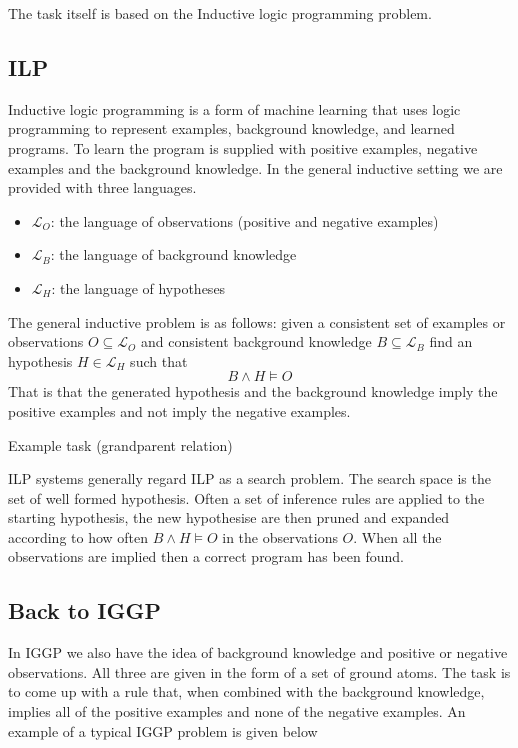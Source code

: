The task itself is based on the Inductive logic programming problem.

\subsection{ILP}\label{sec:ILP}
Inductive logic programming is a form of machine learning that uses logic programming to represent examples, background knowledge, and learned programs\cite{Cropper/EfficientLearning}. To learn the program is supplied with positive examples, negative examples and the background knowledge. In the general inductive setting we are provided with three languages.
\begin{itemize}
\item $\mathcal{L}_O$: the language of observations (positive and negative examples)
\item $\mathcal{L}_B$: the language of background knowledge
\item $\mathcal{L}_H$: the language of hypotheses
\end{itemize}
The general inductive problem is as follows: given a consistent set of examples or observations $O \subseteq \mathcal{L}_O$ and consistent background knowledge $B \subseteq \mathcal{L}_B$ find an hypothesis $H \in \mathcal{L}_H$ such that \[B \wedge H \vDash O\] \cite{Muggleton/ILP}
That is that the generated hypothesis and the background knowledge imply the positive examples and not imply the negative examples.

Example task (grandparent relation)

ILP systems generally regard ILP as a search problem. The search space is the set of well formed hypothesis. Often a set of inference rules are applied to the starting hypothesis, the new hypothesise are then pruned and expanded according to how often $B \wedge H \vDash O$ in the observations $O$. When all the observations are implied then a correct program has been found.

\subsection{Back to IGGP}

In IGGP we also have the idea of background knowledge and positive or negative observations. All three are given in the form of a set of ground atoms. The task is to come up with a rule that, when combined with the background knowledge, implies all of the positive examples and none of the negative examples. An example of a typical IGGP problem is given below

